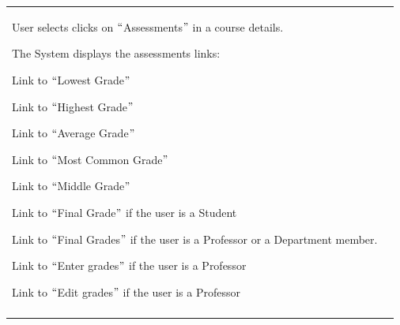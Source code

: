 \documentclass[11pt]{article}
\begin{document}
\begin{table}[H]
\begin{tabular}{p{1.23in}p{4.87in}}
{\begin{ucmenum}
	\item User selects clicks on $``$Assessments$"$  in a course details. \par 	\item The System displays the assessments links: \par 	\item Link to $``$Lowest Grade$"$  \par 	\item Link to $``$Highest Grade$"$  \par 	\item Link to $``$Average Grade$"$  \par 	\item Link to $``$Most Common Grade$"$  \par 	\item Link to $``$Middle Grade$"$  \par 	\item Link to $``$Final Grade$"$  if the user is a Student \par 	\item Link to $``$Final Grades$"$  if the user is a Professor or a Department member. \par 	\item Link to $``$Enter grades$"$  if the user is a Professor \par 	\item Link to $``$Edit grades$"$  if the user is a Professor
\end{ucmenum}} \\
\hhline{--}

\end{tabular}
 \end{table}






\newpage

\vspace{\baselineskip}
\vspace{\baselineskip}


\end{document}
